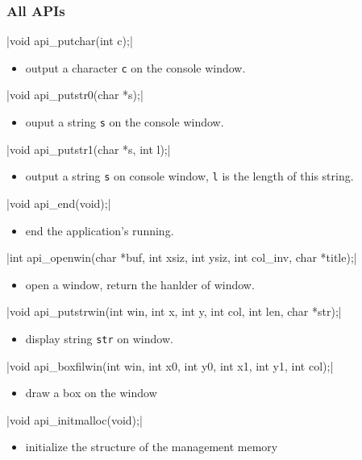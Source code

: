 \documentclass{swfcthesis}
\begin{document}
\subsubsection{All APIs}
\label{sec:all-apis}

\csingle|void api_putchar(int c);|
\begin{itemize}
\item output a character \texttt{c} on the console window.
\end{itemize}

\csingle|void api_putstr0(char *s);|
\begin{itemize}
\item ouput a string \texttt{s} on the console window.
\end{itemize}

\csingle|void api_putstr1(char *s, int l);|
\begin{itemize}
\item output a string \texttt{s} on console window, \texttt{l} is the length of this string.
\end{itemize}

\csingle|void api_end(void);|
\begin{itemize}
\item end the application's running.
\end{itemize}

\csingle|int api_openwin(char *buf, int xsiz, int ysiz, int col_inv, char *title);|
\begin{itemize}
\item open a window, return the hanlder of window.
\end{itemize}

\csingle|void api_putstrwin(int win, int x, int y, int col, int len, char *str);|
\begin{itemize}
\item display string \texttt{str} on window. 
\end{itemize}

\csingle|void api_boxfilwin(int win, int x0, int y0, int x1, int y1, int col);|
\begin{itemize}
\item draw a box on the window
\end{itemize}

\csingle|void api_initmalloc(void);|
\begin{itemize}
\item initialize the structure of the management memory
\end{itemize}
\end{document}
